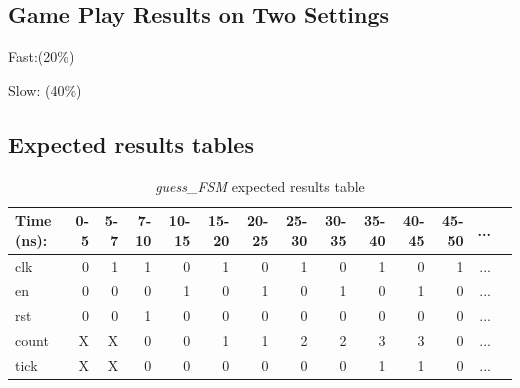 \documentclass[11pt]{article}
\begin{document}
\subsection*{Game Play Results on Two Settings}
Fast:(20\%)

Slow: (40\%)

\subsection*{Expected results tables}

		

\begin{table}[ht]\centering
	\caption{\textit{guess\_FSM} expected results table}
	\label{ALU:tbl:alu_ERT}\medskip
	\begin{tabular}{l|rrrrrrrrrrrrr}
		Time (ns): & 0-5 & 5-7 & 7-10 & 10-15 & 15-20 & 20-25 & 25-30 & 30-35 & 35-40 & 40-45 & 45-50 &...\\
		\midrule
		clk & 0  & 1 & 1 & 0 & 1 & 0 & 1 & 0 & 1 & 0 & 1 & ... \\
		en & 0 & 0 & 0 & 1 & 0 & 1 & 0 & 1 & 0 & 1 & 0 & ...\\
		rst & 0 & 0 & 1& 0 & 0 & 0 & 0 & 0 & 0 & 0 & 0 & ... \\
		\midrule
		count & X & X & 0 & 0  & 1 & 1 & 2 & 2 & 3 & 3 & 0 & ... \\
		tick & X & X & 0 & 0 & 0 & 0 & 0 & 0 & 1 & 1 & 0& ... \\
		\bottomrule
	\end{tabular}
\end{table}
\end{document}
